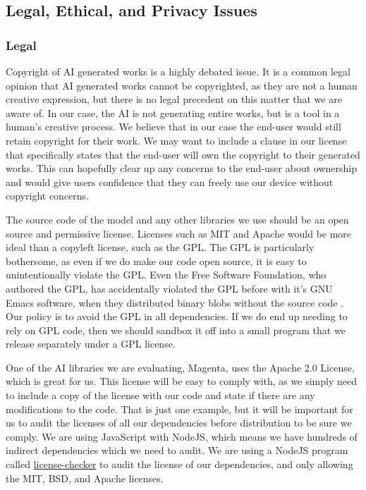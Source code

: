 \subsection{Legal, Ethical, and Privacy Issues}

\subsubsection{Legal}

Copyright of AI generated works is a highly debated issue. It is a common legal opinion
that AI generated works cannot be copyrighted, as they are not a human creative
expression, but there is no legal precedent on this matter that we are aware of. In our
case, the AI is not generating entire works, but is a tool in a human's creative process.
We believe that in our case the end-user would still retain copyright for their work.
We may want to include a clause in our license that specifically states that the end-user
will own the copyright to their generated works. This can hopefully clear up any concerns
to the end-user about ownership and would give users confidence that they can freely use
our device without copyright concerns.

The source code of the model and any other libraries we use should be an open source and
permissive license. Licenses such as MIT and Apache would be more ideal than a copyleft
license, such as the GPL. The GPL is particularly bothersome, as even if we do make our
code open source, it is easy to unintentionally violate the GPL. Even the Free Software
Foundation, who authored the GPL, has accidentally violated the GPL before with it's GNU
Emacs software, when they distributed binary blobs without the source code
\autocite{emacsGplViolation}. Our policy is to avoid the GPL in all dependencies. If we do
end up needing to rely on GPL code, then we should sandbox it off into a small program
that we release separately under a GPL license.

One of the AI libraries we are evaluating, Magenta, uses the Apache 2.0 License, which is
great for us. This license will be easy to comply with, as we simply need to include a
copy of the license with our code and state if there are any modifications to the code.
That is just one example, but it will be important for us to audit the licenses of all our
dependencies before distribution to be sure we comply. We are using JavaScript with
NodeJS, which means we have hundreds of indirect dependencies which we need to audit. We
are using a NodeJS program called \url{license-checker} to audit the license of our
dependencies, and only allowing the MIT, BSD, and Apache licenses.

